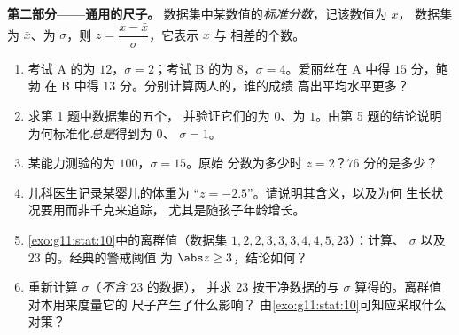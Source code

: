\begin{problem}
\medskip
\noindent\textbf{第二部分——通用的尺子。}
数据集中某数值的\emph{标准分数}，记该数值为 $x$，
数据集为 $\bar x$、为 $\sigma$，则
$z = \dfrac{x - \bar x}{\sigma}$，它表示 $x$ 与
相差的个数。
\begin{enumerate}[resume]
  \item 考试 A 的为 $12$，$\sigma = 2$；考试 B 的为
        $8$，$\sigma = 4$。爱丽丝在 A 中得 $15$ 分，鲍勃
        在 B 中得 $13$ 分。分别计算两人的，谁的成绩
        高出平均水平更多？
  \item 求第 1 题中数据集的五个，
        并验证它们的为 $0$、为
        $1$。由第 5 题的结论说明
        为何标准化\emph{总是}得到为 $0$、
        $\sigma = 1$。
  \item 某能力测验的为 $100$，$\sigma = 15$。原始
        分数为多少时 $z = 2$？$76$ 分的是多少？
  \item 儿科医生记录某婴儿的体重为
        “$z = -2.5$”。请说明其含义，以及为何
        生长状况要用而非千克来追踪，
        尤其是随孩子年龄增长。
  \item \cref{exo:g11:stat:10}中的离群值（数据集
        $1, 2, 2, 3, 3, 3, 4, 4, 5, 23$）：计算、
        $\sigma$ 以及 $23$ 的。经典的警戒阈值
        为 $\abs z \geq 3$，结论如何？
  \item 重新计算 $\sigma$（\emph{不含} $23$ 的数据），
        并求 $23$ 按干净数据的与
        $\sigma$ 算得的。离群值对本用来度量它的
        尺子产生了什么影响？
        由\cref{exo:g11:stat:10}可知应采取什么对策？
\end{enumerate}


\end{problem}
